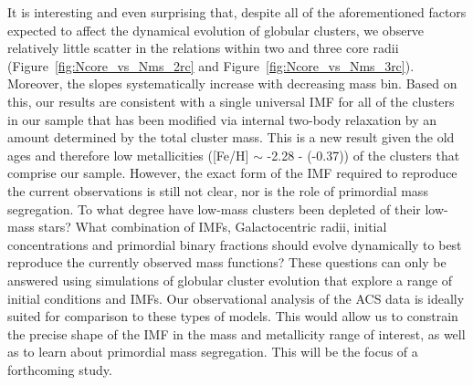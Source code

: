 It is interesting and even surprising that, despite all of the
aforementioned factors 
expected to affect the dynamical evolution of globular clusters, we
observe relatively little scatter in the relations within two and
three core radii (Figure~\ref{fig:Ncore_vs_Nms_2rc} and
Figure~\ref{fig:Ncore_vs_Nms_3rc}).  Moreover, the slopes
systematically increase with decreasing mass bin.  Based on this, our
results are consistent with a single universal IMF for all of the
clusters in our sample that has been modified via internal two-body
relaxation by an amount determined by the total cluster mass.  
%
This is a new result given 
the old ages and therefore low metallicities ([Fe/H] $\sim$ -2.28 -
(-0.37)) of the clusters that comprise our sample.  However, the  
exact form of the IMF required to reproduce the current observations is
still not clear, nor is the role of primordial mass segregation.  To
what degree have low-mass clusters been depleted of 
their low-mass stars?  What combination of IMFs, Galactocentric
radii, initial concentrations and primordial binary fractions 
should evolve dynamically to best reproduce the currently observed
mass functions?  These questions can only be answered using 
simulations of globular cluster evolution that explore a range of
initial conditions and IMFs.  Our observational analysis of
the ACS data is ideally suited for comparison to these types of
models.  This would allow us to constrain the precise shape of the IMF
in the mass and metallicity range of interest, as well as to learn about
primordial mass segregation.  This will be the focus of a forthcoming
study. 

%

